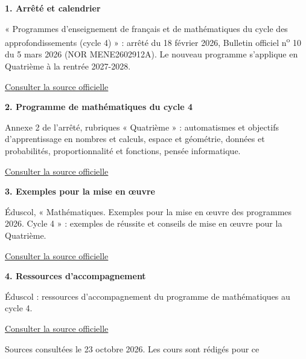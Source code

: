 \clearpage\thispagestyle{otFront}\label{references}\fontsize{11}{15}\selectfont
\par\medskip\textbf{1. Arrêté et calendrier}\par « Programmes d’enseignement de français et de mathématiques du cycle des approfondissements (cycle 4) » : arrêté du 18 février 2026, Bulletin officiel n\textsuperscript{o} 10 du 5 mars 2026 (NOR MENE2602912A). Le nouveau programme s’applique en Quatrième à la rentrée 2027-2028.\par\href{https://www.education.gouv.fr/bo/2026/Hebdo10/MENE2602912A}{\textcolor{otGreenDark}{Consulter la source officielle}}\par
\par\medskip\textbf{2. Programme de mathématiques du cycle 4}\par Annexe 2 de l’arrêté, rubriques « Quatrième » : automatismes et objectifs d’apprentissage en nombres et calculs, espace et géométrie, données et probabilités, proportionnalité et fonctions, pensée informatique.\par\href{https://www.education.gouv.fr/sites/default/files/document/Annexe%202%20%E2%80%93%20Programme%20de%20math%C3%A9matiques%20pour%20le%20cycle%204-480716.pdf}{\textcolor{otGreenDark}{Consulter la source officielle}}\par
\par\medskip\textbf{3. Exemples pour la mise en œuvre}\par Éduscol, « Mathématiques. Exemples pour la mise en œuvre des programmes 2026. Cycle 4 » : exemples de réussite et conseils de mise en œuvre pour la Quatrième.\par\href{https://eduscol.education.gouv.fr/sites/default/files/document/exemple-mise-en-oeuvre-c4-mathematiques0pdf-126080.pdf}{\textcolor{otGreenDark}{Consulter la source officielle}}\par
\par\medskip\textbf{4. Ressources d’accompagnement}\par Éduscol : ressources d’accompagnement du programme de mathématiques au cycle 4.\par\href{https://eduscol.education.gouv.fr/5736/ressources-d-accompagnement-du-programme-de-mathematiques-au-cycle-4}{\textcolor{otGreenDark}{Consulter la source officielle}}\par
\par\bigskip Sources consultées le 23 octobre 2026. Les cours sont rédigés pour ce
